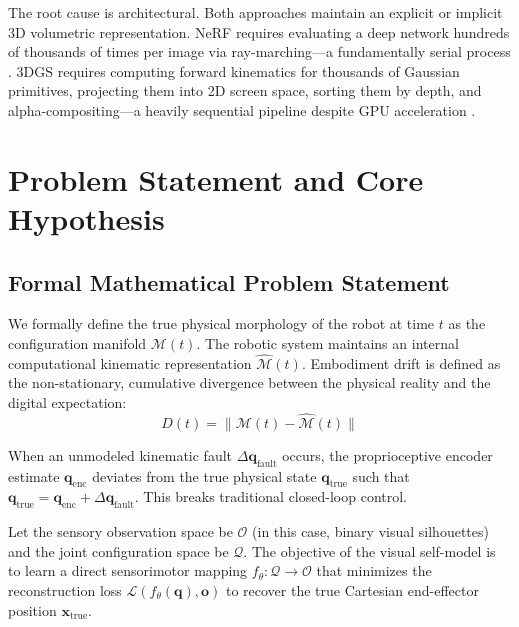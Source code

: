 \documentclass[12pt,a4paper,oneside]{report}
\begin{document}
The root cause is architectural. Both approaches maintain an explicit or implicit 3D volumetric representation. NeRF requires evaluating a deep network hundreds of thousands of times per image via ray-marching---a fundamentally serial process \cite{mildenhall2020nerf, muller2022instant, barron2021mip, barron2023zipnerf, pumarola2021d, park2021nerfies}. 3DGS requires computing forward kinematics for thousands of Gaussian primitives, projecting them into 2D screen space, sorting them by depth, and alpha-compositing---a heavily sequential pipeline despite GPU acceleration \cite{kerbl20233d, matsuki2024gaussian, keetha2024splattam, guedon2024sugar, lassanske2024gaurast}.

\section{Problem Statement and Core Hypothesis}
\label{sec:problem_hypothesis_intro}

\subsection{Formal Mathematical Problem Statement}
\label{subsec:formal_mathematical_problem_statement_intro}

We formally define the true physical morphology of the robot at time $t$ as the configuration manifold $\mathcal{M}(t)$. The robotic system maintains an internal computational kinematic representation $\hat{\mathcal{M}}(t)$. Embodiment drift is defined as the non-stationary, cumulative divergence between the physical reality and the digital expectation:
\begin{equation}
D(t) = \|\mathcal{M}(t) - \hat{\mathcal{M}}(t)\|
\end{equation}

When an unmodeled kinematic fault $\Delta \mathbf{q}_{\text{fault}}$ occurs, the proprioceptive encoder estimate $\mathbf{q}_{\text{enc}}$ deviates from the true physical state $\mathbf{q}_{\text{true}}$ such that $\mathbf{q}_{\text{true}} = \mathbf{q}_{\text{enc}} + \Delta \mathbf{q}_{\text{fault}}$. This breaks traditional closed-loop control. 

Let the sensory observation space be $\mathcal{O}$ (in this case, binary visual silhouettes) and the joint configuration space be $\mathcal{Q}$. The objective of the visual self-model is to learn a direct sensorimotor mapping $f_\theta: \mathcal{Q} \rightarrow \mathcal{O}$ that minimizes the reconstruction loss $\mathcal{L}(f_\theta(\mathbf{q}), \mathbf{o})$ to recover the true Cartesian end-effector position $\mathbf{x}_{\text{true}}$. 
\end{document}
